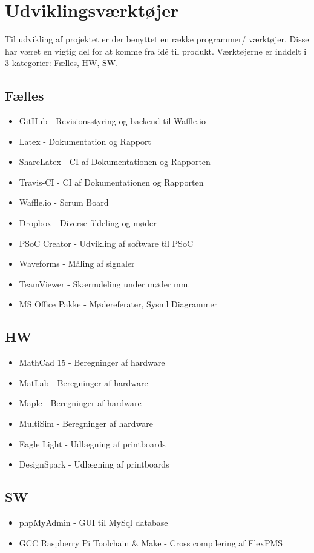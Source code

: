 \section{Udviklingsværktøjer}
Til udvikling af projektet er der benyttet en række programmer/ værktøjer. 
Disse har været en vigtig del for at komme fra idé til produkt. 
Værktøjerne er inddelt i 3 kategorier: Fælles, HW, SW.

\subsection{Fælles}
\begin{itemize}
\item GitHub - Revisionsstyring og backend til Waffle.io
\item Latex - Dokumentation og Rapport
\item ShareLatex - CI af Dokumentationen og Rapporten
\item Travis-CI - CI af Dokumentationen og Rapporten
\item Waffle.io - Scrum Board
\item Dropbox - Diverse fildeling og møder
\item PSoC Creator - Udvikling af software til PSoC
\item Waveforms - Måling af signaler
\item TeamViewer - Skærmdeling under møder mm.
\item MS Office Pakke - Mødereferater, Sysml Diagrammer
\end{itemize}

\subsection{HW}
\begin{itemize}
\item MathCad 15 - Beregninger af hardware
\item MatLab - Beregninger af hardware
\item Maple - Beregninger af hardware
\item MultiSim - Beregninger af hardware
\item Eagle Light - Udlægning af printboards
\item DesignSpark - Udlægning af printboards
\end{itemize}

\subsection{SW} 
\begin{itemize}
\item phpMyAdmin - GUI til MySql database
\item GCC Raspberry Pi Toolchain \& Make - Cross compilering af FlexPMS
\end{itemize}